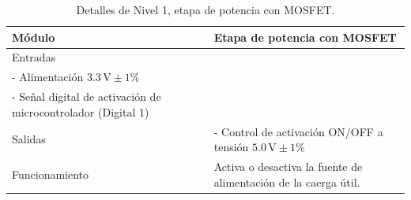 \begin{table}[h!]
    \centering
    \caption{Detalles de Nivel 1, etapa de potencia con MOSFET.}
    \label{tab:nivel1_MOSFET}
    \begin{tabular}{ll}
    \toprule
        Módulo  & Etapa de potencia con MOSFET\\ 
    \midrule
        Entradas & 
        \begin{minipage}[t]{0.75\linewidth}
 - Alimentación $5.0 \, \text{V} \pm 1\%$\\
 - Alimentación $3.3 \, \text{V} \pm 1\%$\\
 - Señal digital de activación de microcontrolador (Digital 1)
 
        \end{minipage} \\
    \midrule
        Salidas & 
        \begin{minipage}[t]{0.75\linewidth}
    - Control de activación ON/OFF a tensión $5.0 \, \text{V} \pm 1\%$

        \end{minipage} \\
    \midrule
        Funcionamiento & 
        \begin{minipage}[t]{0.75\linewidth}
Activa o desactiva la fuente de alimentación de la caerga útil. 

        \end{minipage} \\
    \bottomrule
    \end{tabular}
\end{table}

\vspace{4 cm}

